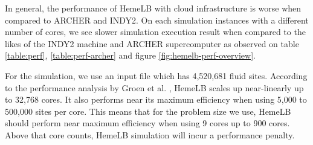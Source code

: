 \vspace{1cm}

\noindent%
\begin{minipage}{\linewidth}%
 \label{fig:hemelb-perf-overview}%
\end{minipage}

\vspace{1cm}


In general, the performance of HemeLB with cloud infrastructure is worse when compared to ARCHER and INDY2. On each simulation instances with a different number of cores, we see slower simulation execution result when compared to the likes of the INDY2 machine and ARCHER supercomputer as observed on table \ref{table:perf}, \ref{table:perf-archer} and figure \ref{fig:hemelb-perf-overview}.

For the simulation, we use an input file which has 4,520,681 fluid sites. According to the performance analysis by Groen et al. \citep{groen2013analysing}, HemeLB scales up near-linearly up to 32,768 cores. It also performs near its maximum efficiency when using 5,000 to 500,000 sites per core. This means that for the problem size we use, HemeLB should perform near maximum efficiency when using 9 cores up to 900 cores. Above that core counts, HemeLB simulation will incur a performance penalty.

